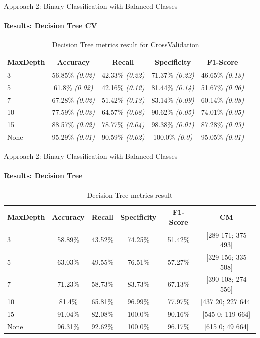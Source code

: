 \documentclass[9pt, pstricks, xcolor=dvipsnames]{beamer}
\begin{document}
\begin{frame}{Approach 2: Binary Classification
with Balanced Classes}
\framesubtitle{Results: Decision Tree CV}
\begin{table}[H]
\centering
\begin{tabular}{lcccc}
\toprule
MaxDepth & Accuracy & Recall & Specificity & F1-Score \\
\midrule
3 & 56.85\% \textit{(0.02)} & 42.33\% \textit{(0.22)} & 71.37\% \textit{(0.22)} & 46.65\% \textit{(0.13)} \\
5 & 61.8\% \textit{(0.02)} & 42.16\% \textit{(0.12)} & 81.44\% \textit{(0.14)} & 51.67\% \textit{(0.06)} \\
7 & 67.28\% \textit{(0.02)} & 51.42\% \textit{(0.13)} & 83.14\% \textit{(0.09)} & 60.14\% \textit{(0.08)} \\
10 & 77.59\% \textit{(0.03)} & 64.57\% \textit{(0.08)} & 90.62\% \textit{(0.05)} & 74.01\% \textit{(0.05)} \\
15 & 88.57\% \textit{(0.02)} & 78.77\% \textit{(0.04)} & 98.38\% \textit{(0.01)} & 87.28\% \textit{(0.03)} \\
None & 95.29\% \textit{(0.01)} & 90.59\% \textit{(0.02)} & 100.0\% \textit{(0.0)} & 95.05\% \textit{(0.01)} \\
\bottomrule
\end{tabular}
\caption{Decision Tree metrics result for CrossValidation}
\label{tab:DT_CV_approach2}
\end{table}
\end{frame}
\begin{frame}{Approach 2: Binary Classification
with Balanced Classes}
\framesubtitle{Results: Decision Tree}
\begin{table}[H]
\centering
\begin{tabular}{lccccc}
\toprule
MaxDepth & Accuracy & Recall & Specificity & F1-Score & CM \\
\midrule
3 & 58.89\%  & 43.52\%  & 74.25\%  & 51.42\% & [289 171; 375 493] \\
5 & 63.03\%  & 49.55\%  & 76.51\%  & 57.27\% & [329 156; 335 508] \\
7 & 71.23\%  & 58.73\%  & 83.73\%  & 67.13\% & [390 108; 274 556] \\
10 & 81.4\%  & 65.81\%  & 96.99\%  & 77.97\% & [437 20; 227 644] \\
15 & 91.04\%  & 82.08\%  & 100.0\%  & 90.16\% & [545 0; 119 664] \\
None & 96.31\%  & 92.62\%  & 100.0\%  & 96.17\% & [615 0; 49 664] \\
\bottomrule
\end{tabular}
\caption{Decision Tree metrics result}
\label{tab:dt_approach2}
\end{table}
\end{frame}
\end{document}
